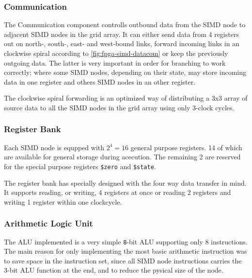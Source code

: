 \subsubsection{Communication}
The Communication component controlls outbound data from the \ac{SIMD} node to
adjacent \ac{SIMD} nodes in the grid array. It can either send data from 4
registers out on north-, south-, east- and west-bound links, forward incoming
links in an clockwise spiral according to \ref{fig:fpga-simd-datacom} or keep
the previously outgoing data. The latter is very important in order for
branching to work correctly; where some \ac{SIMD} nodes, depending on their
state, may store incoming data in one register and others \ac{SIMD} nodes in an
other register.

The clockwise spiral forwarding is an optimized way of distributing a 3x3 array
of source data to all the \ac{SIMD} nodes in the grid array using only 3-clock
cycles. 

\subsubsection{Register Bank}
Each \ac{SIMD} node is equpped with $2^4 = 16$ general purpose registers. 14 of
which are available for general storage during acecution. The remaining 2 are
reserved for the special purpose registers {\tt \$zero} and {\tt \$state}.



The register bank has specially designed with the four way data transfer in
mind. It supports reading, or writing, 4 registers at once or reading 2
registers and writing 1 register within one clockcycle.

\subsubsection{Arithmetic Logic Unit}


The \ac{ALU} implemented is a very simple {\tt 8}-bit \ac{ALU} supporting only 8
instructions. The main reason for only implementing the most basic arithmetic
instruction was to save space in the instruction set, since all \ac{SIMD} node
instructions carries the 3-bit \ac{ALU} function at the end, and to reduce the
pysical size of the node.

